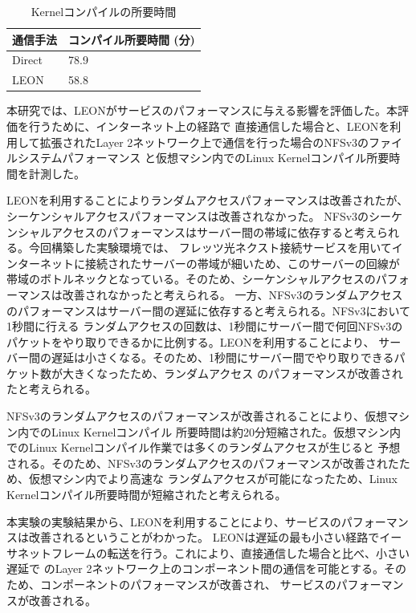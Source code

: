 \begin{table}[tb]
        \begin{center}
                \caption{Kernelコンパイルの所要時間}
                \begin{tabular}{|l|l|}
                        \hline
                                通信手法 & コンパイル所要時間 (分) \\
                        \hline
			\hline
                                Direct & 78.9 \\
			\hline
				LEON & 58.8\\
                        \hline
                \end{tabular}
                \label{kernelcompile}
        \end{center}
\end{table}

本研究では、LEONがサービスのパフォーマンスに与える影響を評価した。本評価を行うために、インターネット上の経路で
直接通信した場合と、LEONを利用して拡張されたLayer 2ネットワーク上で通信を行った場合のNFSv3のファイルシステムパフォーマンス
と仮想マシン内でのLinux Kernelコンパイル所要時間を計測した。

LEONを利用することによりランダムアクセスパフォーマンスは改善されたが、シーケンシャルアクセスパフォーマンスは改善されなかった。
NFSv3のシーケンシャルアクセスのパフォーマンスはサーバー間の帯域に依存すると考えられる。今回構築した実験環境では、
フレッツ光ネクスト接続サービスを用いてインターネットに接続されたサーバーの帯域が細いため、このサーバーの回線が
帯域のボトルネックとなっている。そのため、シーケンシャルアクセスのパフォーマンスは改善されなかったと考えられる。
一方、NFSv3のランダムアクセスのパフォーマンスはサーバー間の遅延に依存すると考えられる。NFSv3において1秒間に行える
ランダムアクセスの回数は、1秒間にサーバー間で何回NFSv3のパケットをやり取りできるかに比例する。LEONを利用することにより、
サーバー間の遅延は小さくなる。そのため、1秒間にサーバー間でやり取りできるパケット数が大きくなったため、ランダムアクセス
のパフォーマンスが改善されたと考えられる。

NFSv3のランダムアクセスのパフォーマンスが改善されることにより、仮想マシン内でのLinux Kernelコンパイル
所要時間は約20分短縮された。仮想マシン内でのLinux Kernelコンパイル作業では多くのランダムアクセスが生じると
予想される。そのため、NFSv3のランダムアクセスのパフォーマンスが改善されたため、仮想マシン内でより高速な
ランダムアクセスが可能になったため、Linux Kernelコンパイル所要時間が短縮されたと考えられる。

本実験の実験結果から、LEONを利用することにより、サービスのパフォーマンスは改善されるということがわかった。
LEONは遅延の最も小さい経路でイーサネットフレームの転送を行う。これにより、直接通信した場合と比べ、小さい遅延で
のLayer 2ネットワーク上のコンポーネント間の通信を可能とする。そのため、コンポーネントのパフォーマンスが改善され、
サービスのパフォーマンスが改善される。

